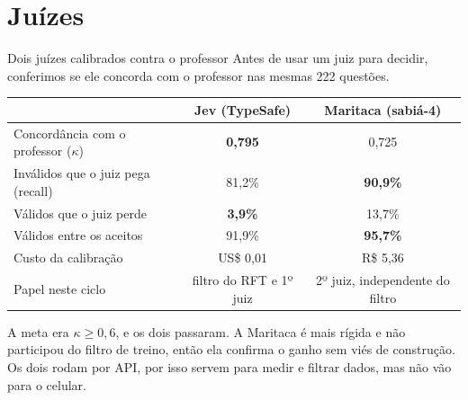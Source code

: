 \documentclass[aspectratio=169,11pt]{beamer}
\begin{document}
\section{Juízes}
\begin{frame}{Dois juízes calibrados contra o professor}
  \small
  Antes de usar um juiz para decidir, conferimos se ele concorda com o professor nas mesmas 222 questões.
  \vspace{6pt}

  \centering
  \begin{tabular}{@{}lcc@{}}
    \toprule
    & \textbf{Jev} (TypeSafe) & \textbf{Maritaca} (sabiá-4) \\
    \midrule
    Concordância com o professor ($\kappa$) & \textbf{0,795} & 0,725 \\
    Inválidos que o juiz pega (recall)      & 81,2\% & \textbf{90,9\%} \\
    Válidos que o juiz perde                & \textbf{3,9\%} & 13,7\% \\
    Válidos entre os aceitos                & 91,9\% & \textbf{95,7\%} \\
    Custo da calibração                     & US\$ 0,01 & R\$ 5,36 \\
    Papel neste ciclo                       & filtro do RFT e 1º juiz & 2º juiz, independente do filtro \\
    \bottomrule
  \end{tabular}
  \vspace{6pt}

  \raggedright
  \small A meta era $\kappa \geq 0{,}6$, e os dois passaram. A Maritaca é mais rígida e não participou do filtro
  de treino, então ela confirma o ganho sem viés de construção. Os dois rodam por API, por isso servem para medir e
  filtrar dados, mas não vão para o celular.
\end{frame}

\end{document}
